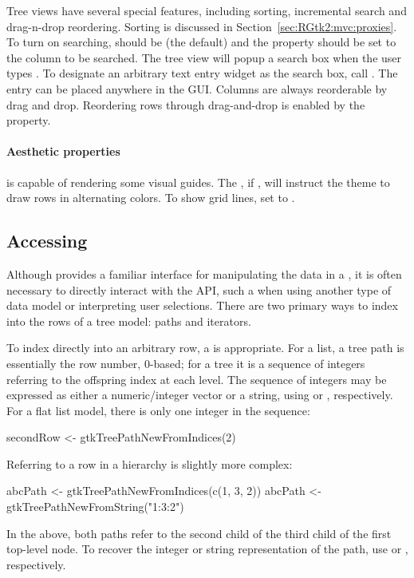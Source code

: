 Tree views have several special features, including sorting,
incremental search and drag-n-drop reordering. Sorting is discussed in
Section~\ref{sec:RGtk2:mvc:proxies}. To turn on searching,
 should be  (the default) and the
 property should be set to the column to be
searched. The tree view will popup a search box when the user types
. To designate an arbitrary text entry widget as the
search box, call . The entry can
be placed anywhere in the GUI. Columns are always reorderable by drag
and drop. Reordering rows through drag-and-drop is enabled by the
 property.

\paragraph{Aesthetic properties}

 is capable of rendering some visual guides. The
, if , will instruct the theme to draw
rows in alternating colors. To show grid lines, set
 to .

\subsection{Accessing }
\label{sec:RGtk2:mvc:iterators}

Although  provides a familiar interface for
manipulating the data in a , it is often necessary
to directly interact with the \GTK\/ API, such a when using another
type of data model or interpreting user selections. There are two
primary ways to index into the rows of a tree model: paths and
iterators.

To index directly into an arbitrary row, a  is
appropriate. For a list, a tree path is essentially the row number,
$0$-based; for a tree it is a sequence of integers referring to the
offspring index at each level. The sequence of integers may be
expressed as either a numeric/integer vector or a string, using
 or
, respectively. For a flat list
model, there is only one integer in the sequence:
\begin{Schunk}
\begin{Sinput}
 secondRow <- gtkTreePathNewFromIndices(2)
\end{Sinput}
\end{Schunk}
Referring to a row in a hierarchy is slightly more complex:
\begin{Schunk}
\begin{Sinput}
 abcPath <- gtkTreePathNewFromIndices(c(1, 3, 2))
 abcPath <- gtkTreePathNewFromString("1:3:2")
\end{Sinput}
\end{Schunk}
In the above, both paths refer to the second child of the third child
of the first top-level node. To recover the integer or string
representation of the path, use  or
, respectively.

